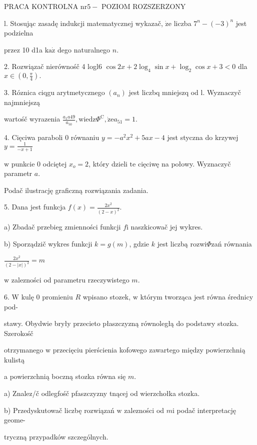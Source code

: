 \documentclass[a4paper,12pt]{article}
\begin{document}
PRACA KONTROLNA $\mathrm{n}\mathrm{r}5-$ POZIOM ROZSZERZONY

l. Stosując zasadę indukcji matematycznej wykazač, $\dot{\mathrm{z}}\mathrm{e}$ liczba $7^{n}-(-3)^{n}$ jest podzielna

przez 10 d1a $\mathrm{k}\mathrm{a}\dot{\mathrm{z}}$ dego naturalnego $n.$

2. Rozwiązač nierównośč 4 logl6 $\cos 2x+2\log_{4}\sin x+\log_{2}\cos x+3<0$ dla $x\displaystyle \in(0,\frac{\pi}{4}).$

3. Róznica ciqgu arytmetycznego $(a_{n})$ jest liczbq mniejszq od l. Wyznaczyč najmniejszą

wartośč wyrazenia $\displaystyle \frac{a_{1}a49}{a_{50}}, \mathrm{w}\mathrm{i}\mathrm{e}\mathrm{d}\mathrm{z}\Phi^{\mathrm{C}}, \dot{\mathrm{z}}\mathrm{e}a_{51}=1.$

4. Cięciwa paraboli $0$ równaniu $y=-a^{2}x^{2}+5ax-4$ jest styczna do krzywej $y=\displaystyle \frac{1}{-x+1}$

$\mathrm{w}$ punkcie $0$ odciętej $x_{o}=2$, który dzieli $\mathrm{t}\mathrm{e}$ cięciwę na połowy. Wyznaczyč parametr $a.$

Podač ilustrację graficzną rozwiązania zadania.

5. Dana jest funkcja $f(x)=\displaystyle \frac{2x^{2}}{(2-x)^{2}}.$

a) Zbadač przebieg zmienności funkcji $f\mathrm{i}$ naszkicowač jej wykres.

b) Sporządzič wykres funkcji $k=g(m)$, gdzie $k$ jest liczbą rozwi$\Phi$zań równania

$\displaystyle \frac{2x^{2}}{(2-|x|)^{2}}=m$

$\mathrm{w}$ zalezności od parametru rzeczywistego $m.$

6. $\mathrm{W}$ kulę $0$ promieniu $R$ wpisano stozek, $\mathrm{w}$ którym tworząca jest równa średnicy pod-

stawy. Obydwie bryły przecieto płaszczyzną równoległą do podstawy stozka. Szerokośč

otrzymanego $\mathrm{w}$ przecięciu pierścienia kofowego zawartego między powierzchnią kulistą

a powierzchnią boczną stozka równa się $m.$

a) Znalez/č odlegfośč pfaszczyzny tnącej od wierzchołka stozka.

b) Przedyskutowač liczbę rozwiązań $\mathrm{w}$ zalezności od $m\mathrm{i}$ podač interpretację geome-

tryczną przypadków szczególnych.
\end{document}
